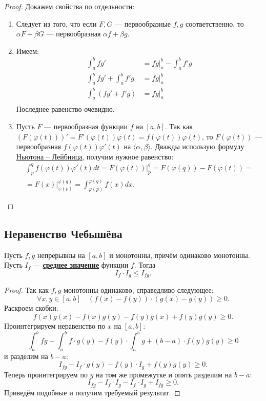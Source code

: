 \begin{proof}
	Докажем свойства по отдельности:
	\begin{enumerate}
		\item Следует из того, что если $F, G$ --- первообразные $f, g$ соответственно,
		то $\alpha F + \beta G$ --- первообразная $\alpha f + \beta g$.
		\item Имеем:
		\begin{align*}
			\int_a^b fg' &= fg \bigg|_a^b - \int_a^b f'g \\
			\int_a^b fg' + \int_a^b f'g &= fg \bigg|_a^b \\
			\int_a^b (fg' + f'g) &= fg \bigg|_a^b		   \\
		\end{align*}
		Последнее равенство очевидно.
		\item Пусть $F$ --- первообразная функции $f$ на $[a, b]$. Так как \\ 
		\hbox{$(F(\varphi(t)))' = F'(\varphi(t)) \varphi(t) = f(\varphi(t)) \varphi(t)$}, то
		$F(\varphi(t))$ --- первообразная $f(\varphi(t)) \varphi'(t)$ на $\langle \alpha, \beta \rangle$.
		Дважды использую \hyperlink{t9}{формулу Ньютона -- Лейбница}, получим нужное равенство:
		\begin{multline*}
			\int_p^q f(\varphi(t))\varphi'(t) dt = F(\varphi(t)) \bigg|_p^q = F(\varphi(q)) - F(\varphi(t)) = \\
			= F(x) \bigg|_{\varphi(p)}^{\varphi(q)} = \int_{\varphi(p)}^{\varphi(q)} f(x) dx.
		\end{multline*}
	\end{enumerate}
\end{proof}

\subsection{Неравенство Чебышёва}

\begin{theorem}
	Пусть \(f, g\) непрерывны на \([a, b]\) и монотонны, причём одинаково монотонны. Пусть \(I_f\) --- \hyperlink{average}{\bfseries среднее значение} функции \(f\). Тогда \[
	I_f \cdot I_g \leqslant I_{fg}.
	\]
\end{theorem}

\begin{proof}
	Так как \(f, g\) монотонны одинаково, справедливо следующее: \[
	\forall x, y \in [a, b] \quad (f(x) - f(y)) \cdot (g(x) - g(y)) \geqslant 0.
	\]
	Раскроем скобки: \[
	f(x)g(x) - f(x)g(y) - f(y)g(x) + f(y)g(y) \geqslant 0.
	\]
	Проинтегрируем неравенство по \(x\) на \([a, b]\): \[
	\int_a^b fg - \int_a^b f \cdot g(y) - f(y) \cdot \int_a^b g + (b - a) \cdot f(y)g(y) \geqslant 0
	\]
	и разделим на \(b - a\): \[
	I_{fg} - I_f \cdot g(y) - f(y) \cdot I_g + f(y)g(y) \geqslant 0.
	\]
	Теперь проинтегрируем по \(y\) на том же промежутке и опять разделим на \(b - a\): \[
	I_{fg} - I_f \cdot I_g - I_f \cdot I_g + I_{fg} \geqslant 0.
	\]
	Приведём подобные и получим требуемый результат.
\end{proof}

